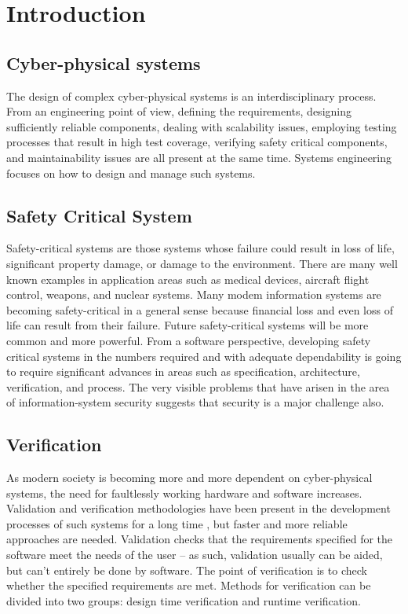 \chapter{Introduction}
\label{chap:intro}

\section*{Cyber-physical systems}

The design of complex cyber-physical systems is an interdisciplinary process. From an engineering point of view, defining the requirements, designing sufficiently reliable components, dealing with scalability issues, employing testing processes that result in high test coverage, verifying safety critical components, and maintainability issues are all present at the same time. Systems engineering focuses on how to design and manage such systems. \cite{randomwikipedialink1} \cite{randomwikipedialink2}

\section*{Safety Critical System}

Safety-critical systems are those systems whose failure could result in loss of life, significant property damage, or damage to the environment. There are many well known examples in application areas such as medical devices, aircraft flight control, weapons, and nuclear systems. Many modem information systems are becoming safety-critical in a general sense because financial loss and even loss of life can result from their failure. Future safety-critical systems will be more common and more powerful. From a software perspective, developing safety critical systems in the numbers required and with adequate dependability is going to require significant advances in areas such as specification, architecture, verification, and process. The very visible problems that have arisen in the area of information-system security suggests that security is a major challenge also. \cite{safetycritical}

\section*{Verification}

As modern society is becoming more and more dependent on cyber-physical systems, the need for faultlessly working hardware and software increases. Validation and verification methodologies have been present in the development processes of such systems for a long time \citep{ieee1012}, but faster and more reliable approaches are needed. Validation checks that the requirements specified for the software meet the needs of the user -- as such, validation usually can be aided, but can’t entirely be done by software. The point of verification is to check whether the specified requirements are met. Methods for verification can be divided into two groups: design time verification and runtime verification.

